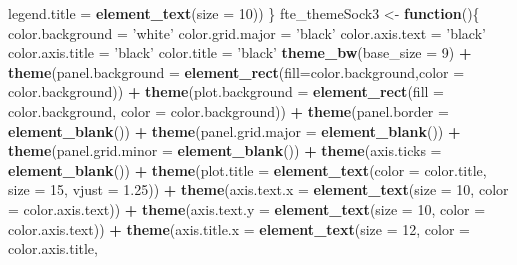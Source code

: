 \documentclass[]{article}
\newenvironment{Shaded}{\begin{snugshade}}{\end{snugshade}}
\newcommand{\KeywordTok}[1]{\textcolor[rgb]{0.13,0.29,0.53}{\textbf{#1}}}
\newcommand{\DataTypeTok}[1]{\textcolor[rgb]{0.13,0.29,0.53}{#1}}
\newcommand{\DecValTok}[1]{\textcolor[rgb]{0.00,0.00,0.81}{#1}}
\newcommand{\FloatTok}[1]{\textcolor[rgb]{0.00,0.00,0.81}{#1}}
\newcommand{\StringTok}[1]{\textcolor[rgb]{0.31,0.60,0.02}{#1}}
\newcommand{\ControlFlowTok}[1]{\textcolor[rgb]{0.13,0.29,0.53}{\textbf{#1}}}
\newcommand{\OperatorTok}[1]{\textcolor[rgb]{0.81,0.36,0.00}{\textbf{#1}}}
\newcommand{\NormalTok}[1]{#1}
\begin{document}
\begin{Shaded}
\begin{Highlighting}[]
          \DataTypeTok{legend.title =} \KeywordTok{element_text}\NormalTok{(}\DataTypeTok{size =} \DecValTok{10}\NormalTok{))}
\NormalTok{\} }
\NormalTok{fte_themeSock3 <-}\StringTok{ }\ControlFlowTok{function}\NormalTok{()\{}
\NormalTok{  color.background =}\StringTok{ 'white'}
\NormalTok{  color.grid.major =}\StringTok{ 'black'}
\NormalTok{  color.axis.text =}\StringTok{ 'black'}
\NormalTok{  color.axis.title =}\StringTok{ 'black'}
\NormalTok{  color.title =}\StringTok{ 'black'}
  \KeywordTok{theme_bw}\NormalTok{(}\DataTypeTok{base_size =} \DecValTok{9}\NormalTok{) }\OperatorTok{+}\StringTok{ }
\StringTok{    }\KeywordTok{theme}\NormalTok{(}\DataTypeTok{panel.background =} \KeywordTok{element_rect}\NormalTok{(}\DataTypeTok{fill=}\NormalTok{color.background,}\DataTypeTok{color =}\NormalTok{ color.background)) }\OperatorTok{+}
\StringTok{    }\KeywordTok{theme}\NormalTok{(}\DataTypeTok{plot.background =} \KeywordTok{element_rect}\NormalTok{(}\DataTypeTok{fill =}\NormalTok{ color.background, }\DataTypeTok{color =}\NormalTok{ color.background)) }\OperatorTok{+}
\StringTok{    }\KeywordTok{theme}\NormalTok{(}\DataTypeTok{panel.border =} \KeywordTok{element_blank}\NormalTok{()) }\OperatorTok{+}
\StringTok{    }\KeywordTok{theme}\NormalTok{(}\DataTypeTok{panel.grid.major =} \KeywordTok{element_blank}\NormalTok{()) }\OperatorTok{+}\StringTok{ }
\StringTok{    }\KeywordTok{theme}\NormalTok{(}\DataTypeTok{panel.grid.minor =} \KeywordTok{element_blank}\NormalTok{()) }\OperatorTok{+}\StringTok{ }
\StringTok{    }\KeywordTok{theme}\NormalTok{(}\DataTypeTok{axis.ticks =} \KeywordTok{element_blank}\NormalTok{()) }\OperatorTok{+}
\StringTok{    }\KeywordTok{theme}\NormalTok{(}\DataTypeTok{plot.title =} \KeywordTok{element_text}\NormalTok{(}\DataTypeTok{color =}\NormalTok{ color.title, }\DataTypeTok{size =} \DecValTok{15}\NormalTok{, }\DataTypeTok{vjust =} \FloatTok{1.25}\NormalTok{)) }\OperatorTok{+}
\StringTok{    }\KeywordTok{theme}\NormalTok{(}\DataTypeTok{axis.text.x =} \KeywordTok{element_text}\NormalTok{(}\DataTypeTok{size =} \DecValTok{10}\NormalTok{, }\DataTypeTok{color =}\NormalTok{ color.axis.text)) }\OperatorTok{+}\StringTok{ }
\StringTok{    }\KeywordTok{theme}\NormalTok{(}\DataTypeTok{axis.text.y =} \KeywordTok{element_text}\NormalTok{(}\DataTypeTok{size =} \DecValTok{10}\NormalTok{, }\DataTypeTok{color =}\NormalTok{ color.axis.text)) }\OperatorTok{+}\StringTok{ }
\StringTok{    }\KeywordTok{theme}\NormalTok{(}\DataTypeTok{axis.title.x =} \KeywordTok{element_text}\NormalTok{(}\DataTypeTok{size =} \DecValTok{12}\NormalTok{, }\DataTypeTok{color =}\NormalTok{ color.axis.title, }

\end{Highlighting}
\end{Shaded}
\end{document}
